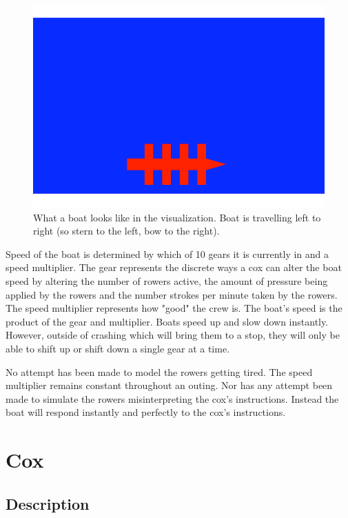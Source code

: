       \begin{figure}[h]
      \begin{center}
      	\includegraphics[scale=0.3]{images/boat.png}
      	\caption{What a boat looks like in the visualization. Boat is travelling left to right (so stern to the left, bow to the right).}
      	\label{fig:model:boat}
      \end{center}
      \end{figure}
      
      Speed of the boat is determined by which of 10 gears it is currently in and a speed multiplier. The gear represents the discrete ways a cox can alter the boat speed by altering the number of rowers active, the amount of pressure being applied by the rowers and the number strokes per minute taken by the rowers. The speed multiplier represents how "good" the crew is. The boat's speed is the product of the gear and multiplier. Boats speed up and slow down instantly. However, outside of crashing which will bring them to a stop, they will only be able to shift up or shift down a single gear at a time.
      
      No attempt has been made to model the rowers getting tired. The speed multiplier remains constant throughout an outing. Nor has any attempt been made to simulate the rowers misinterpreting the cox's instructions. Instead the boat will respond instantly and perfectly to the cox's instructions.
      
    \section{Cox}
      \subsection{Description}
